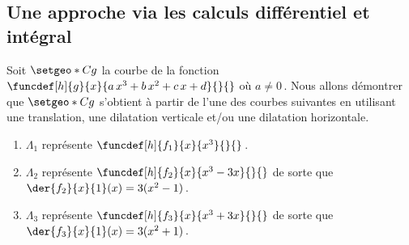 \subsection{Une approche via les calculs différentiel et intégral}

\leavevmode
\smallskip




Soit $\setgeo*{C}{g}$ la courbe de la fonction
$\funcdef[h]{g}{x}{a \, x^3 + b \, x^2 + c \, x + d}{}{}$
où $a\neq 0$\,.
Nous allons démontrer que $\setgeo*{C}{g}$ s'obtient à partir de l'une des courbes suivantes en utilisant une translation, une dilatation verticale et/ou une dilatation horizontale.

\begin{enumerate}
	\item $\Lambda_1$ représente $\funcdef[h]{f_1}{x}{x^3}{}{}$\,.

	\item $\Lambda_2$ représente $\funcdef[h]{f_2}{x}{x^3 - 3 x}{}{}$ de sorte que $\der{f_2}{x}{1}(x) = 3(x^2 - 1)$\,.

	\item $\Lambda_3$ représente $\funcdef[h]{f_3}{x}{x^3 + 3 x}{}{}$ de sorte que $\der{f_3}{x}{1}(x) = 3(x^2 + 1)$\,.
\end{enumerate}




